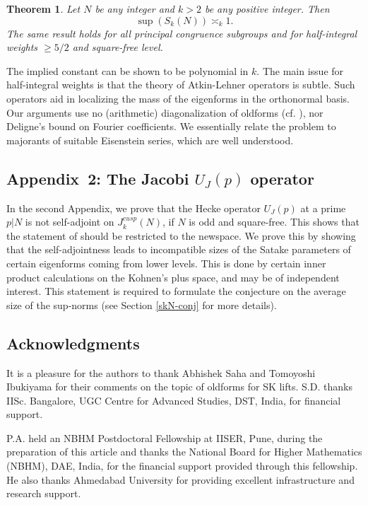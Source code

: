 \documentclass[11pt]{amsart}
\numberwithin{equation}{section}
\theoremstyle{plain}
\newtheorem{thm}{Theorem}[section]
\theoremstyle{definition}
\begin{document}
\begin{thm} \label{skn-int}
    Let $N$ be any integer and $k >2$ be any positive integer. Then
    \begin{equation}
        \sup( S_{k}(N) )\asymp_k 1. 
    \end{equation}
    The same result holds for all principal congruence subgroups and for half-integral weights $\ge 5/2$ and square-free level.
\end{thm}
The implied constant can be shown to be polynomial in $k$.
The main issue for half-integral weights is that the theory of Atkin-Lehner operators is subtle. Such operators aid in localizing the mass of the eigenforms in the orthonormal basis.
Our arguments use no (arithmetic) diagonalization of oldforms (cf. \cite{michel1998points}), nor Deligne's bound on Fourier coefficients. We essentially relate the problem to majorants of suitable Eisenstein series, which are well understood.

\subsection{\texorpdfstring{Appendix~2: The Jacobi $U_J(p)$ operator}{the jacobi operator}} \label{intro-app2}

In the second Appendix, we prove that the Hecke operator $U_J(p)$ at a prime $p|N$ is not self-adjoint on $J^{cusp}_k(N)$, if $N$ is odd and square-free. This shows that the statement of \cite[Proposition~2]{Ag-Br} should be restricted to the newspace. We prove this by
showing that the self-adjointness leads to incompatible sizes of the Satake parameters of certain eigenforms coming from lower levels. 
This is done by certain inner product calculations on the Kohnen's plus space, and may be of independent interest. This statement is required to formulate the conjecture on the average size of the sup-norms (see Section \ref{skN-conj} for more details).

\subsection*{Acknowledgments}
{\small
It is a pleasure for the authors to thank Abhishek Saha and Tomoyoshi Ibukiyama for their comments on the topic of oldforms for SK lifts.
S.D. thanks IISc. Bangalore, UGC Centre for Advanced Studies, DST, India, for financial support.

P.A. held an NBHM Postdoctoral Fellowship at IISER, Pune, during the preparation of this article and thanks the National Board for Higher Mathematics (NBHM), DAE, India, for the financial support provided through this fellowship. He also thanks Ahmedabad University for providing excellent infrastructure and research support. }
\end{document}
